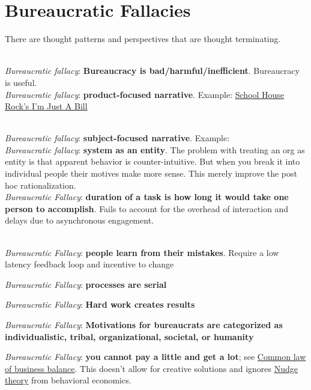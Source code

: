 \section{Bureaucratic Fallacies\label{sec:fallacies}}

There are thought patterns and perspectives that are \gls{thought terminating}. 

\ \\

\textit{Bureaucratic fallacy}: \textbf{Bureaucracy is bad/harmful/inefficient}. Bureaucracy is useful.
\ \\

\textit{Bureaucratic fallacy}: \textbf{product-focused narrative}. Example: \href{https://www.youtube.com/watch?v=OgVKvqTItto}{School House Rock's I'm Just A Bill}

\ \\

\textit{Bureaucratic fallacy}: \textbf{subject-focused narrative}. Example: 
\ \\

\textit{Bureaucratic fallacy}: \textbf{system as an entity}. \cite{2002_Gall}
The problem with treating an org as entity is that apparent behavior is counter-intuitive. But when you break it into individual people their motives make more sense. This merely improve the post hoc rationalization. 
\ \\

\textit{Bureaucratic Fallacy}: \textbf{duration of a task is how long it would take one person to accomplish}. Fails to account for the overhead of interaction and delays due to asynchronous engagement.

\ \\

\textit{Bureaucratic Fallacy}: \textbf{people learn from their mistakes}. Require a low latency feedback loop and incentive to change

\textit{Bureaucratic Fallacy}: \textbf{processes are serial}


\textit{Bureaucratic Fallacy}: \textbf{Hard work creates results}

\textit{Bureaucratic Fallacy}: \textbf{Motivations for bureaucrats are categorized as individualistic, tribal, organizational, societal, or humanity}


\textit{Bureaucratic Fallacy}: \textbf{you cannot pay a little and get a lot}; see \href{https://en.wikipedia.org/wiki/Common_law_of_business_balance}{Common law of business balance}. 
This doesn't allow for creative solutions and ignores \href{https://en.wikipedia.org/wiki/Nudge_theory}{Nudge theory} from behavioral economics. 